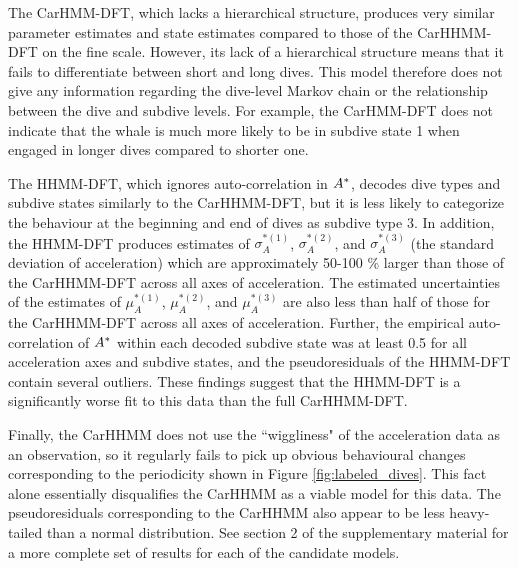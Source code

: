 The CarHMM-DFT, which lacks a hierarchical structure, produces very similar parameter estimates and state estimates compared to those of the CarHHMM-DFT on the fine scale. However, its lack of a hierarchical structure means that it fails to differentiate between short and long dives. This model therefore does not give any information regarding the dive-level Markov chain or the relationship between the dive and subdive levels. For example, the CarHMM-DFT does not indicate that the whale is much more likely to be in subdive state 1 when engaged in longer dives compared to shorter one.

The HHMM-DFT, which ignores auto-correlation in $A^*$, decodes dive types and subdive states similarly to the CarHHMM-DFT, but it is less likely to categorize the behaviour at the beginning and end of dives as subdive type 3. In addition, the HHMM-DFT produces estimates of $\sigma_A^{*(1)}$, $\sigma_A^{*(2)}$, and $\sigma_A^{*(3)}$ (the standard deviation of acceleration) which are approximately 50-100 \% larger than those of the CarHHMM-DFT across all axes of acceleration. The estimated uncertainties of the estimates of $\mu_A^{*(1)}$, $\mu_A^{*(2)}$, and $\mu_A^{*(3)}$ are also less than half of those for the CarHHMM-DFT across all axes of acceleration. Further, the empirical auto-correlation of $A^*$ within each decoded subdive state was at least 0.5 for all acceleration axes and subdive states, and the pseudoresiduals of the HHMM-DFT contain several outliers. These findings suggest that the HHMM-DFT is a significantly worse fit to this data than the full CarHHMM-DFT.

Finally, the CarHHMM does not use the ``wiggliness" of the acceleration data as an observation, so it regularly fails to pick up obvious behavioural changes corresponding to the periodicity shown in Figure \ref{fig:labeled_dives}. This fact alone essentially disqualifies the CarHHMM as a viable model for this data. The pseudoresiduals corresponding to the CarHHMM also appear to be less heavy-tailed than a normal distribution. See section 2 of the supplementary material for a more complete set of results for each of the candidate models.